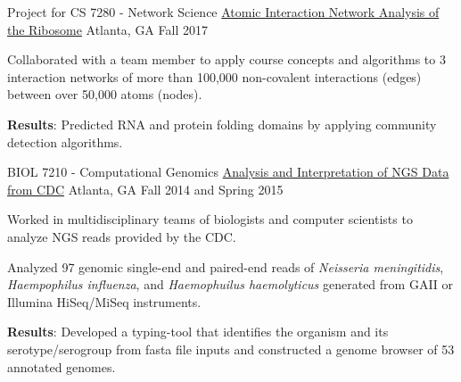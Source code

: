 \begin{cventries}
  \cventry
    {Project for CS 7280 - Network Science} %
    {\href{https://nbviewer.jupyter.org/github/NicholasAKovacs/CS7280_Ribosomal_Network_Analysis/blob/master/Jupyter_Notebooks/EsCo_complete_and_SaCe_rPro_analysis/Interaction_Network_Analysis_of_Complete_Ecoli_ribosome_and_Yeast_LSU_rProteins.ipynb}{Atomic Interaction Network Analysis of the Ribosome}} %
    {Atlanta, GA} %
    {Fall 2017} %
    {
      \begin{cvitems} %
      	\item Collaborated with a team member to apply course concepts and algorithms to 3 interaction networks of more than 100,000 non-covalent interactions (edges) between over 50,000 atoms (nodes). 
      	\item {\bf Results}: Predicted RNA and protein folding domains by applying community detection algorithms.
      \end{cvitems}
    }

  \cventry
    {BIOL 7210 - Computational Genomics} %
    {\href{http://compgenomics2015.biology.gatech.edu/index.php/Main_Page}{Analysis and Interpretation of NGS Data from CDC}} %
    {Atlanta, GA} %
    {Fall 2014 and Spring 2015} %
    {
      \begin{cvitems} %
      	\item Worked in multidisciplinary teams of biologists and computer scientists to analyze NGS reads provided by the CDC.
      	\item Analyzed 97 genomic single-end and paired-end reads of \textit{Neisseria meningitidis}, \textit{Haempophilus influenza}, and \textit{Haemophuilus haemolyticus} generated from GAII or Illumina HiSeq/MiSeq instruments.
      	\item {\bf Results}: Developed a typing-tool that identifies the organism and its serotype/serogroup from fasta file inputs and constructed a genome browser of 53 annotated genomes.
      \end{cvitems}
    }


\end{cventries}
